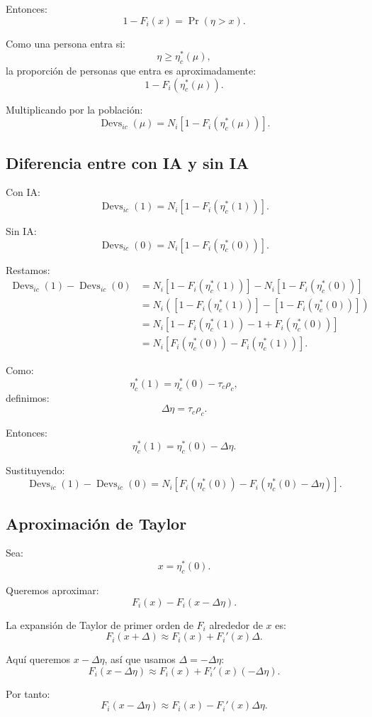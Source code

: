 \documentclass[11pt,a4paper]{article}
\newcommand{\Devs}{\operatorname{Devs}}
\begin{document}
Entonces:
\[
1-F_i(x)=\Pr(\eta>x).
\]

Como una persona entra si:
\[
\eta\geq \eta_c^*(\mu),
\]
la proporción de personas que entra es aproximadamente:
\[
1-F_i(\eta_c^*(\mu)).
\]

Multiplicando por la población:
\[
\Devs_{ic}(\mu)=N_i\left[1-F_i(\eta_c^*(\mu))\right].
\]

\subsection{Diferencia entre con IA y sin IA}

Con IA:
\[
\Devs_{ic}(1)=N_i\left[1-F_i(\eta_c^*(1))\right].
\]

Sin IA:
\[
\Devs_{ic}(0)=N_i\left[1-F_i(\eta_c^*(0))\right].
\]

Restamos:
\begin{align*}
\Devs_{ic}(1)-\Devs_{ic}(0)
&=
N_i\left[1-F_i(\eta_c^*(1))\right]
-
N_i\left[1-F_i(\eta_c^*(0))\right]\\
&=
N_i\left(
\left[1-F_i(\eta_c^*(1))\right]
-
\left[1-F_i(\eta_c^*(0))\right]
\right)\\
&=
N_i\left[
1-F_i(\eta_c^*(1))-1+F_i(\eta_c^*(0))
\right]\\
&=
N_i\left[
F_i(\eta_c^*(0))-F_i(\eta_c^*(1))
\right].
\end{align*}

Como:
\[
\eta_c^*(1)=\eta_c^*(0)-\tau_c\rho_c,
\]
definimos:
\[
\Delta\eta=\tau_c\rho_c.
\]

Entonces:
\[
\eta_c^*(1)=\eta_c^*(0)-\Delta\eta.
\]

Sustituyendo:
\[
\Devs_{ic}(1)-\Devs_{ic}(0)
=
N_i\left[
F_i(\eta_c^*(0))
-F_i(\eta_c^*(0)-\Delta\eta)
\right].
\]

\subsection{Aproximación de Taylor}

Sea:
\[
x=\eta_c^*(0).
\]

Queremos aproximar:
\[
F_i(x)-F_i(x-\Delta\eta).
\]

La expansión de Taylor de primer orden de \(F_i\) alrededor de \(x\) es:
\[
F_i(x+\Delta)\approx F_i(x)+F_i'(x)\Delta.
\]

Aquí queremos \(x-\Delta\eta\), así que usamos \(\Delta=-\Delta\eta\):
\[
F_i(x-\Delta\eta)
\approx
F_i(x)+F_i'(x)(-\Delta\eta).
\]

Por tanto:
\[
F_i(x-\Delta\eta)
\approx
F_i(x)-F_i'(x)\Delta\eta.
\]
\end{document}
